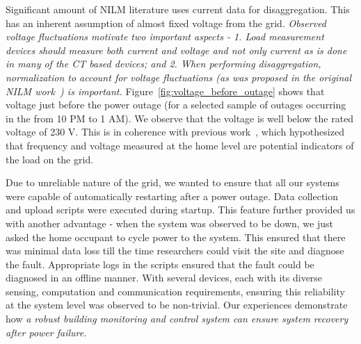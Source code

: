 \documentclass[10pt]{sensys-proc}
\newcommand{\redcolor}[1]{\textcolor{red}{#1}}
\newcommand{\figref}[1]{Figure~\ref{#1}}
\begin{document}
Significant amount of NILM literature uses current data
for disaggregation. This has an inherent assumption of almost fixed voltage from the grid. \emph{Observed voltage fluctuations motivate two important aspects - 1. Load measurement devices should measure both current and voltage and not only current as is done in many of the CT based devices; and 2. When performing disaggregation, normalization to account for voltage fluctuations (as was proposed in the original NILM work~\cite{hart}) is important.}
\figref{fig:voltage_before_outage} shows that voltage just before the power outage (for a selected sample of outages occurring in the  from 10 PM to 1 AM). We observe that the voltage is well below the rated voltage of 230 V. This is in coherence with previous work~\cite{nplug}, which hypothesized that frequency and voltage measured at the home level are potential indicators of the load on the grid.

\noindent Due to unreliable nature of the grid, we wanted to ensure that all our systems were capable of automatically restarting after a power outage. Data collection and upload scripts were executed during startup. This feature further provided us with another advantage - when the system was observed to be down, we just asked the home occupant to cycle power to the system. This ensured that there was minimal data loss till the time researchers could visit the site and diagnose the fault. Appropriate logs in the scripts ensured that the fault could be diagnosed in an offline manner.  With several devices, each with its diverse sensing, computation and communication requirements, ensuring this reliability at the system level was observed to be non-trivial. Our experiences demonstrate how \emph{a robust building monitoring and control system can ensure system recovery after power failure.}
\end{document}
